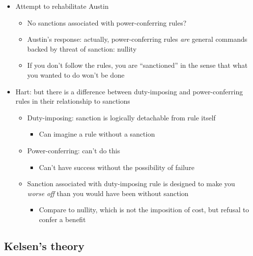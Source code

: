 \begin{itemize}
\tightlist
\item
  Attempt to rehabilitate Austin

  \begin{itemize}
  \tightlist
  \item
    No sanctions associated with power-conferring rules?
  \item
    Austin's response: actually, power-conferring rules \emph{are}
    general commands backed by threat of sanction: nullity
  \item
    If you don't follow the rules, you are ``sanctioned'' in the sense
    that what you wanted to do won't be done
  \end{itemize}
\item
  Hart: but there is a difference between duty-imposing and
  power-conferring rules in their relationship to sanctions

  \begin{itemize}
  \tightlist
  \item
    Duty-imposing: sanction is logically detachable from rule itself

    \begin{itemize}
    \tightlist
    \item
      Can imagine a rule without a sanction
    \end{itemize}
  \item
    Power-conferring: can't do this

    \begin{itemize}
    \tightlist
    \item
      Can't have success without the possibility of failure
    \end{itemize}
  \item
    Sanction associated with duty-imposing rule is designed to make you
    \emph{worse off} than you would have been without sanction

    \begin{itemize}
    \tightlist
    \item
      Compare to nullity, which is not the imposition of cost, but
      refusal to confer a benefit
    \end{itemize}
  \end{itemize}
\end{itemize}

\hypertarget{kelsens-theory}{%
\subsection{Kelsen's theory}\label{kelsens-theory}}

